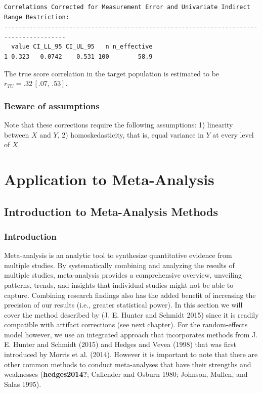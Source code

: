 \documentclass[
  letterpaper,
  DIV=11,
  numbers=noendperiod]{scrreprt}
\begin{document}
\begin{tcolorbox}
\begin{verbatim}
Correlations Corrected for Measurement Error and Univariate Indirect Range Restriction:
---------------------------------------------------------------------------------------
  value CI_LL_95 CI_UL_95   n n_effective
1 0.323   0.0742    0.531 100        58.9
\end{verbatim}

The true score correlation in the target population is estimated to be
\(r_{TU} = .32\, [.07,\, .53]\).

\end{tcolorbox}

\hypertarget{beware-of-assumptions}{%
\section*{Beware of assumptions}\label{beware-of-assumptions}}


Note that these corrections require the following assumptions: 1)
linearity between \(X\) and \(Y\), 2) homoskedasticity, that is, equal
variance in \(Y\) at every level of \(X\).

\part{Application to Meta-Analysis}

\hypertarget{sec-metaanalysis_intro}{%
\chapter{Introduction to Meta-Analysis
Methods}\label{sec-metaanalysis_intro}}

\hypertarget{introduction-7}{%
\section{Introduction}\label{introduction-7}}

Meta-analysis is an analytic tool to synthesize quantitative evidence
from multiple studies. By systematically combining and analyzing the
results of multiple studies, meta-analysis provides a comprehensive
overview, unveiling patterns, trends, and insights that individual
studies might not be able to capture. Combining research findings also
has the added benefit of increasing the precision of our results (i.e.,
greater statistical power). In this section we will cover the method
described by (J. E. Hunter and Schmidt 2015) since it is readily
compatible with artifact corrections (see next chapter). For the
random-effects model however, we use an integrated approach that
incorporates methods from J. E. Hunter and Schmidt (2015) and Hedges and
Vevea (1998) that was first introduced by Morris et al. (2014). However
it is important to note that there are other common methods to conduct
meta-analyses that have their strengths and weaknesses
(\textbf{hedges2014?}; Callender and Osburn 1980; Johnson, Mullen, and
Salas 1995).
\end{document}
